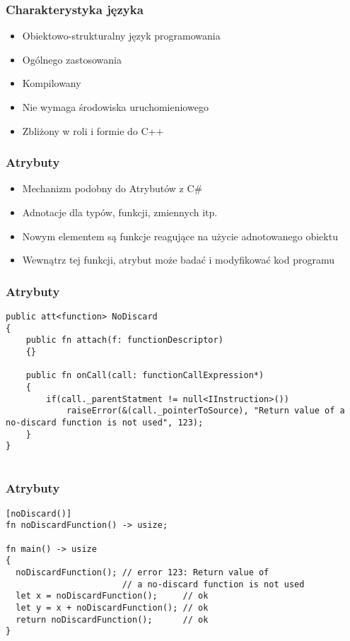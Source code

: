 \begin{frame}
	\frametitle{Charakterystyka języka}

	\begin{itemize}
		\item Obiektowo-strukturalny język programowania
		\item Ogólnego zastosowania
		\item Kompilowany
		\item Nie wymaga środowiska uruchomieniowego
		\item Zbliżony w roli i formie do C++
	\end{itemize}

\end{frame}

\begin{frame}
	\frametitle{Atrybuty}

	\begin{itemize}
		\item Mechanizm podobny do Atrybutów z C\#
		\item Adnotacje dla typów, funkcji, zmiennych itp.
		\item Nowym elementem są funkcje reagujące na użycie adnotowanego obiektu
		\item Wewnątrz tej funkcji, atrybut może badać i modyfikować kod programu
	\end{itemize}

\end{frame}

\begin{frame}[fragile]
	\frametitle{Atrybuty}

	\begin{lstlisting}
public att<function> NoDiscard
{
	public fn attach(f: functionDescriptor)
	{}

	public fn onCall(call: functionCallExpression*)
	{
		if(call._parentStatment != null<IInstruction>())
			raiseError(&(call._pointerToSource), "Return value of a no-discard function is not used", 123);
	}
}
		
	\end{lstlisting}

\end{frame}

\begin{frame}[fragile]
	\frametitle{Atrybuty}

	\begin{lstlisting}
[noDiscard()]
fn noDiscardFunction() -> usize;

fn main() -> usize
{
  noDiscardFunction(); // error 123: Return value of
                       // a no-discard function is not used
  let x = noDiscardFunction();     // ok
  let y = x + noDiscardFunction(); // ok
  return noDiscardFunction();      // ok
}
		
	\end{lstlisting}

\end{frame}


